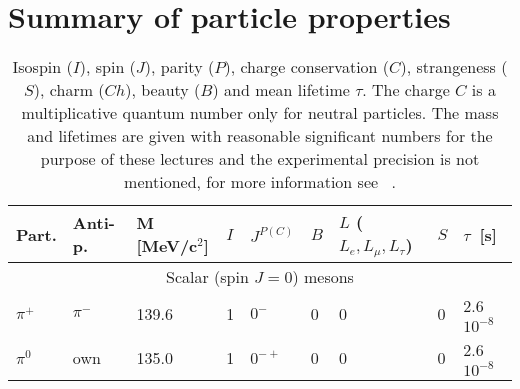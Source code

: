 \chapter{Summary of particle properties}
\label{chap:Properties}

\begin{table}[]
    \centering
    \begin{tabular}{ m{1cm}| m{1cm} | m{1.5cm} | m{0.5cm} | m{0.7cm} | m{0.5cm} | m{1.8cm} | m{0.5cm} | m{1.5cm} }
    \hline \hline
       Part.  & Anti-p. & M [MeV/c$^2$] & $I$ & $J^{P(C)}$  & $B$ & $L$ ($L_e,L_{\mu},L_{\tau}$)  & $S$  & $\tau$~[s]  \\ \hline
       \multicolumn{9}{c}{Scalar (spin $J=0$) mesons} \\ \hline
       
    $\pi^+$  & $\pi^-$  & 139.6 & 1 & $0^{-}$  & 0 & 0 & 0 & 2.6 $10^{-8}$ \\ \hline
       $\pi^0$  & own  & 135.0 & 1 & $0^{-+}$  & 0 & 0 & 0 & 2.6 $10^{-8}$
    \\ \hline \hline
    \end{tabular}
    \caption{Isospin ($I$), spin ($J$), parity ($P$), charge conservation ($C$), strangeness ($S$), charm ($Ch$), beauty ($B$) and mean lifetime $\tau$. The charge $C$ is a multiplicative quantum number only for neutral particles. The mass and lifetimes are given with reasonable significant numbers for the purpose of these lectures and the experimental precision is not mentioned, for more information see
   ~\cite{PDG}.}
    \label{tab:particles}
\end{table}